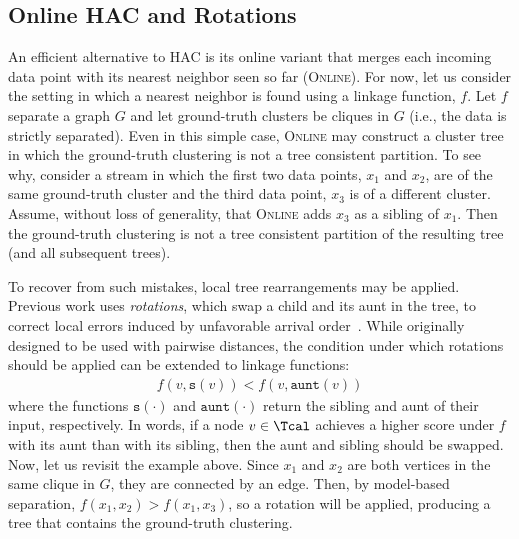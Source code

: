 \documentclass{article} \usepackage[utf8]{inputenc} \usepackage[T1]{fontenc}    \usepackage{hyperref}       \usepackage{url}            \usepackage{booktabs}       \usepackage{amsfonts}       \usepackage{nicefrac}       \usepackage{microtype}      \usepackage{geometry}
\newcommand{\records}{data points\xspace}
\newcommand{\record}{data point\xspace}
\newcommand{\hac}{\textsc{HAC}\xspace}
\newcommand{\greedy}{\textsc{Online}\xspace}
\newcommand{\hof}{linkage function\xspace}
\newcommand{\hofs}{linkage functions\xspace}
\newcommand{\sib}[1]{\ensuremath{\texttt{s}}(#1)\xspace}
\newcommand{\aunt}[1]{\ensuremath{\texttt{aunt}}(#1)\xspace}
\begin{document}
\subsection{Online HAC and Rotations}
\label{subsec:greedy}
An efficient alternative to \hac is its online variant that merges
each incoming \record with its nearest neighbor seen so far
(\greedy). For now, let us consider the setting in which a nearest
neighbor is found using a \hof, $f$.  Let $f$ separate a graph $G$
and let ground-truth clusters be cliques in $G$ (i.e., the data is
strictly separated). Even in this simple case, \greedy may construct a
cluster tree in which the ground-truth clustering is not a tree
consistent partition.  To see why, consider a stream in which the
first two \records, $x_1$ and $x_2$, are of the same ground-truth
cluster and the third \record, $x_3$ is of a different
cluster. Assume, without loss of generality, that \greedy adds $x_3$
as a sibling of $x_1$. Then the ground-truth clustering is not a tree
consistent partition of the resulting tree (and all subsequent trees).

To recover from such mistakes, local tree rearrangements may be
applied. Previous work uses \emph{rotations}, which swap a child and
its aunt in the tree, to correct local errors induced by unfavorable
arrival order~\cite{kobren2017hierarchical}. While originally designed
to be used with pairwise distances, the condition under which rotations
should be applied can be extended to \hofs:
\begin{align}
  \label{eq:rotate}
  f(v,\sib{v}) < f(v, \aunt{v})
\end{align}
where the functions $\sib{\cdot}$ and $\aunt{\cdot}$ return the
sibling and aunt of their input, respectively. In words, if a node
$v \in \Tcal$ achieves a higher score under $f$ with its aunt than
with its sibling, then the aunt and sibling should be swapped. Now,
let us revisit the example above. Since $x_1$ and $x_2$ are both
vertices in the same clique in $G$, they are connected by an
edge. Then, by model-based separation, $f(x_1, x_2) > f(x_1, x_3)$, so
a rotation will be applied, producing a tree that contains the
ground-truth clustering.
\end{document}
